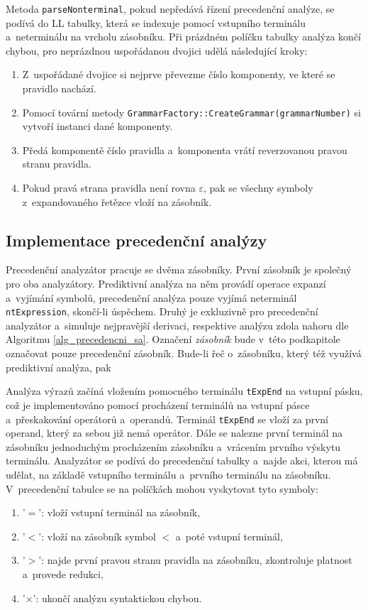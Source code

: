 Metoda \texttt{parseNonterminal}, pokud nepředává řízení precedenční analýze, se podívá do LL tabulky, která se indexuje pomocí vstupního terminálu a~neterminálu na vrcholu zásobníku.
Při prázdném políčku tabulky analýza končí chybou, pro neprázdnou uspořádanou dvojici udělá následující kroky:
\begin{enumerate}
    \item Z~uspořádané dvojice si nejprve převezme číslo komponenty, ve které se pravidlo nachází.
    \item Pomocí tovární metody \texttt{GrammarFactory::CreateGrammar(grammarNumber)} si vytvoří instanci dané komponenty.
    \item Předá komponentě číslo pravidla a~komponenta vrátí reverzovanou pravou stranu pravidla.
    \item Pokud pravá strana pravidla není rovna $\varepsilon$, pak se všechny symboly z~expandovaného řetězce vloží na zásobník.
\end{enumerate}

\subsection*{Implementace precedenční analýzy}
Precedenční analyzátor pracuje se dvěma zásobníky.
První zásobník je společný pro oba analyzátory.
Prediktivní analýza na něm provádí operace expanzí a~vyjímání symbolů, precedenční analýza pouze vyjímá neterminál \texttt{nt\textunderscore Expression}, skončí-li úspěchem. 
Druhý je exkluzivně pro precedenční analyzátor a~simuluje nejpravější derivaci, respektive analýzu zdola nahoru dle Algoritmu \ref{alg_precedencni_sa}.
Označení \emph{zásobník} bude v~této podkapitole označovat pouze precedenční zásobník.
Bude-li řeč o~zásobníku, který též využívá prediktivní analýza, pak 

Analýza výrazů začíná vložením pomocného terminálu \texttt{t\textunderscore ExpEnd} na vstupní pásku, což je implementováno pomocí procházení terminálů na vstupní pásce a~přeskakování operátorů a~operandů.
Terminál \texttt{t\textunderscore ExpEnd} se vloží za první operand, který za sebou již nemá operátor.
Dále se nalezne první terminál na zásobníku jednoduchým procházením zásobníku a~vrácením prvního výskytu terminálu.
Analyzátor se podívá do precedenční tabulky a~najde akci, kterou má udělat, na základě vstupního terminálu a~prvního terminálu na zásobníku.
V~precedenční tabulce se na políčkách mohou vyskytovat tyto symboly:
\begin{enumerate}
    \item '$=$': vloží vstupní terminál na zásobník,
    \item '$<$': vloží na zásobník symbol $<$ a~poté vstupní terminál,
    \item '$>$': najde první pravou stranu pravidla na zásobníku, zkontroluje platnost a~provede redukci,
    \item '$\times$': ukončí analýzu syntaktickou chybou.
\end{enumerate}

